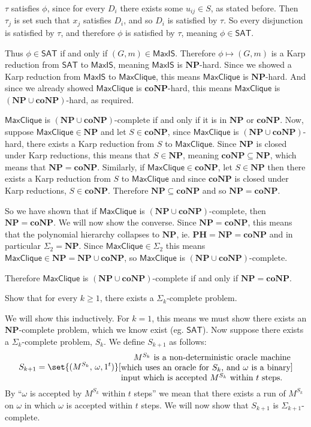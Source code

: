 \documentclass[10pt]{article}
\def\sat{\mathsf{SAT}}
\def\maxIS{\mathsf{MaxIS}}
\def\maxclique{\mathsf{MaxClique}}
\def\PH{\mathbf{PH}}
\def\NP{\mathbf{NP}}
\def\coNP{\mathbf{coNP}}
\begin{document}
    $\tau$ satisfies $\phi$, since for every $D_i$ there exists some $u_{ij}\in S$, as stated before.
    Then $\tau_j$ is set such that $x_j$ satisfies $D_i$, and so $D_i$ is satisfied by $\tau$.
    So every disjunction is satisfied by $\tau$, and therefore $\phi$ is satisfied by $\tau$, meaning $\phi\in\sat$.

    Thus $\phi\in\sat$ if and only if $(G,m)\in\maxIS$.
    Therefore $\phi\mapsto(G,m)$ is a Karp reduction from $\sat$ to $\maxIS$, meaning $\maxIS$ is $\NP$-hard.
    Since we showed a Karp reduction from $\maxIS$ to $\maxclique$, this means $\maxclique$ is $\NP$-hard.
    And since we already showed $\maxclique$ is $\coNP$-hard, this means $\maxclique$ is $(\NP\cup\coNP)$-hard, as required.

    \item $\maxclique$ is $(\NP\cup\coNP)$-complete if and only if it is in $\NP$ or $\coNP$.
    Now, suppose $\maxclique\in\NP$ and let $S\in\coNP$, since $\maxclique$ is $(\NP\cup\coNP)$-hard, there exists a Karp reduction from $S$ to $\maxclique$.
    Since $\NP$ is closed under Karp reductions, this means that $S\in\NP$, meaning $\coNP\subseteq\NP$, which means that $\NP=\coNP$.
    Similarly, if $\maxclique\in\coNP$, let $S\in\NP$ then there exists a Karp reduction from $S$ to $\maxclique$ and since $\coNP$ is closed under Karp reductions, $S\in\coNP$.
    Therefore $\NP\subseteq\coNP$ and so $\NP=\coNP$.

    So we have shown that if $\maxclique$ is $(\NP\cup\coNP)$-complete, then $\NP=\coNP$.
    We will now show the converse.
    Since $\NP=\coNP$, this means that the polynomial hierarchy collapses to $\NP$, ie. $\PH=\NP=\coNP$ and in particular $\Sigma_2=\NP$.
    Since $\maxclique\in\Sigma_2$ this means $\maxclique\in\NP=\NP\cup\coNP$, so $\maxclique$ is $(\NP\cup\coNP)$-complete.

    Therefore $\maxclique$ is $(\NP\cup\coNP)$-complete if and only if $\NP=\coNP$.
\eenum

\newpage
\begin{exercise*}

    Show that for every $k\geq1$, there exists a $\Sigma_k$-complete problem.

\end{exercise*}

We will show this inductively.
For $k=1$, this means we must show there exists an $\NP$-complete problem, which we know exist (eg. $\sat$).
Now suppose there exists a $\Sigma_k$-complete problem, $S_k$.
We define $S_{k+1}$ as follows:
\[ S_{k+1} = \set{(M^{S_k},\,\omega,1^t)}[\vcenter{\advance\hsize by-5cm
$M^{S_k}$ is a non-deterministic oracle machine which uses an oracle for $S_k$, and $\omega$ is a binary input which is accepted $M^{S_k}$ within $t$ steps.}] \]
By ``$\omega$ is accepted by $M^{S_k}$ within $t$ steps'' we mean that there exists a run of $M^{S_k}$ on $\omega$ in which $\omega$ is accepted within $t$ steps.
We will now show that $S_{k+1}$ is $\Sigma_{k+1}$-complete.
\end{document}
